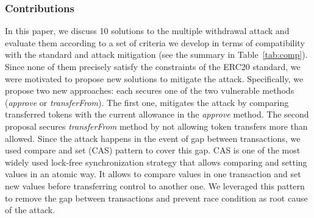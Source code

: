 \subsubsection*{Contributions} In this paper, we discuss 10 solutions to the multiple withdrawal attack and evaluate them according to a set of criteria we develop in terms of compatibility with the standard and attack mitigation (see the summary in Table~\ref{tab:comp}). Since none of them precisely satisfy the constraints of the ERC20 standard, we were motivated to propose new solutions to mitigate the attack. Specifically, we propose  two new approaches: each secures one of the two vulnerable methods (\ie \textit{approve} or \textit{transferFrom}). The first one, mitigates the attack by comparing transferred tokens with the current allowance in the \textit{approve} method. The second proposal secures \textit{transferFrom} method by not allowing token transfers more than allowed. Since the attack happens in the event of gap between transactions, we used compare and set (CAS) pattern\cite{Ref06} to cover this gap. CAS is one of the most widely used lock-free synchronization strategy that allows comparing and setting values in an atomic way. It allows to compare values in one transaction and set new values before transferring control to another one. We leveraged this pattern to remove the gap between transactions and prevent race condition as root cause of the attack.

